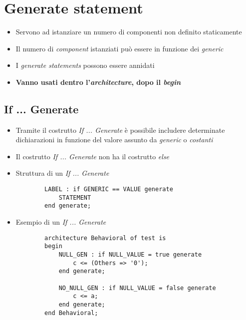 \documentclass{article}
\begin{document}
 \newpage

\section{Generate statement}
\begin{itemize}
	\item Servono ad istanziare un numero di componenti non definito staticamente
	\item Il numero di \textit{component} istanziati può essere in funzione dei \textit{generic} 
	\item I \textit{generate statements} possono essere annidati
	\item \textbf{Vanno usati dentro l'\textit{architecture}, dopo il  \textit{begin}}
\end{itemize}
\subsection{If ... Generate}
\begin{itemize}
	\item Tramite il costrutto \textit{If ... Generate} è possibile includere determinate dichiarazioni in funzione del valore assunto da \textit{generic} o \textit{costanti}
	\item Il costrutto \textit{If ... Generate} non ha il costrutto \textit{else}
	\item Struttura di un \textit{If ... Generate}
	\begin{verbatim}
    	LABEL : if GENERIC == VALUE generate
        	STATEMENT
    	end generate;
    \end{verbatim}
	\item Esempio di un \textit{If ... Generate}
	      \begin{verbatim}
	    architecture Behavioral of test is
        begin
            NULL_GEN : if NULL_VALUE = true generate
                c <= (Others => '0');
            end generate;
        
            NO_NULL_GEN : if NULL_VALUE = false generate
                c <= a;
            end generate;
        end Behavioral;
	      \end{verbatim}
\end{itemize}
\end{document}
